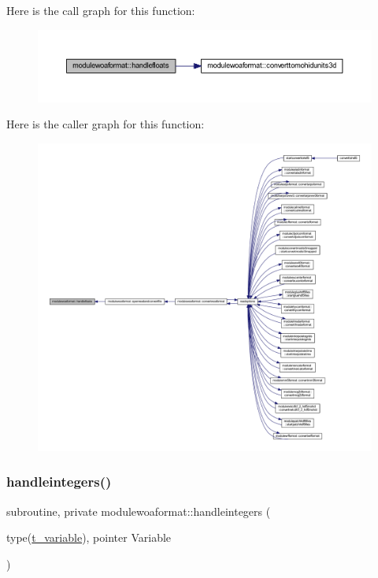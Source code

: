 Here is the call graph for this function\+:\nopagebreak
\begin{figure}[H]
\begin{center}
\leavevmode
\includegraphics[width=350pt]{namespacemodulewoaformat_a6f71dbf9ea3807fb2646798269449c84_cgraph}
\end{center}
\end{figure}
Here is the caller graph for this function\+:\nopagebreak
\begin{figure}[H]
\begin{center}
\leavevmode
\includegraphics[width=350pt]{namespacemodulewoaformat_a6f71dbf9ea3807fb2646798269449c84_icgraph}
\end{center}
\end{figure}
\mbox{\label{namespacemodulewoaformat_a4e5df04e6cd82c093f6173f3e08019aa}} 
\subsubsection{\texorpdfstring{handleintegers()}{handleintegers()}}
{\footnotesize\ttfamily subroutine, private modulewoaformat\+::handleintegers (\begin{DoxyParamCaption}\item[{type(\mbox{\hyperlink{structmodulewoaformat_1_1t__variable}{t\+\_\+variable}}), pointer}]{Variable }\end{DoxyParamCaption})\hspace{0.3cm}{\ttfamily [private]}}

